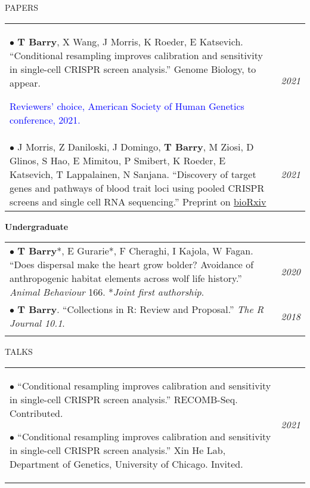 \documentclass{resume} %
\begin{document}
\begin{rSection}{PAPERS}

\begin{tabular}{p{14cm}R{2.5cm}}
	$\bullet$ \textbf{T Barry}, X Wang, J Morris, K Roeder, E Katsevich. ``Conditional resampling improves calibration and sensitivity in single-cell CRISPR screen analysis.'' Genome Biology, to appear.
	
	 \textcolor{blue}{Reviewers’ choice, American Society of Human Genetics conference, 2021.}
	& \textit{2021}  
	\\
	$\bullet$ J Morris, Z Daniloski, J Domingo, \textbf{T Barry}, M Ziosi, D Glinos, S Hao, E Mimitou, P Smibert, K Roeder, E Katsevich, T Lappalainen, N Sanjana. “Discovery of target genes and pathways of blood trait loci using pooled CRISPR screens and single cell RNA sequencing.” Preprint on \href{https://www.biorxiv.org/content/10.1101/2021.04.07.438882v1}{bioRxiv}  & \textit{2021} \\
\end{tabular} 

\textbf{Undergraduate}

\begin{tabular}{p{14cm}R{2.5cm}}
	$\bullet$ \textbf{T Barry}*, E Gurarie*, F Cheraghi, I Kajola, W Fagan. ``Does dispersal make the heart grow bolder? Avoidance of anthropogenic habitat elements across wolf life history.'' \textit{Animal Behaviour} 166. *\textit{Joint first authorship}. & \textit{2020}  \\
	$\bullet$ \textbf{T Barry}. ``Collections in R: Review and Proposal.'' \textit{The R Journal 10.1}. & \textit{2018} \\ &
\end{tabular} 	
\end{rSection}


\begin{rSection}{TALKS}
	
	\begin{tabular}{p{14cm}R{2.5cm}}
		$\bullet$  ``Conditional resampling improves calibration and sensitivity in single-cell CRISPR screen analysis.'' RECOMB-Seq. Contributed.
		
		$\bullet$ ``Conditional resampling improves calibration and sensitivity in single-cell CRISPR screen analysis.'' Xin He Lab, Department of Genetics, University of Chicago. Invited. & \it{2021}
	\end{tabular}
	
\end{rSection}
\end{document}
